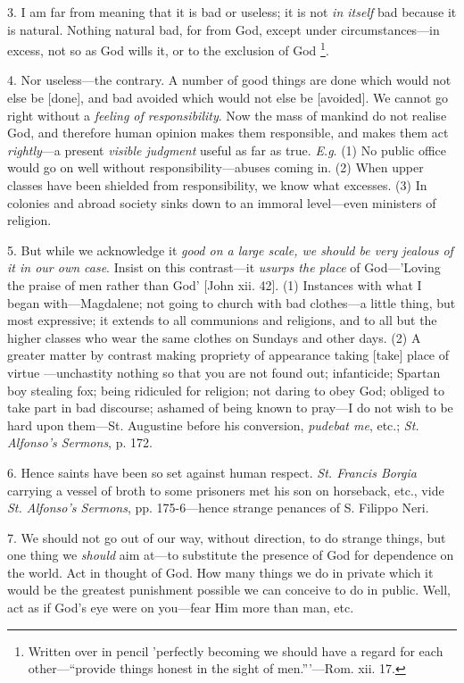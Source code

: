 3. I am far from meaning that it is bad or
useless; it is not \emph{in itself} bad because it is natural. Nothing
natural bad, for from God, except under circumstances—in excess, not
so as God wills it, or to the exclusion of God \footnote{Written over in pencil
'perfectly becoming we should have a regard for each other—``provide
things honest in the sight of men.'''—Rom. xii. 17.}.

4. Nor useless—the contrary. A number of good
things are done which would not else be [done], and bad avoided which
would not else be [avoided]. We cannot go right without a \emph{feeling
of responsibility}. Now the mass of mankind do not realise God, and
therefore human opinion makes them responsible, and makes them act \emph{rightly}—a
present \emph{visible judgment} useful as far as true. \emph{E.g}. (1)
No public office would go on well without responsibility—abuses
coming in. (2) When upper classes have been shielded from
responsibility, we know what excesses. (3) In colonies and abroad
society sinks down to an immoral level—even ministers of religion.

5. But while we acknowledge it \emph{good on a large
scale, we should be very jealous of it in our own case}. Insist on
this contrast—it \emph{usurps the place} of God—'Loving the praise
of men rather than God' [John xii. 42]. (1) Instances with what I
began with—Magdalene; not going to church with bad clothes—a
little thing, but most expressive; it extends to all communions and
religions, and to all but the higher classes who wear the same clothes
on Sundays and other days. (2) A greater matter by contrast making
propriety of appearance taking [take] place of virtue —unchastity
nothing so that you are not found out; infanticide; Spartan boy
stealing fox; being ridiculed for religion; not daring to obey God;
obliged to take part in bad discourse; ashamed of being known to
pray—I do not wish to be hard upon them—St. Augustine before his
conversion, \emph{pudebat me}, etc.; \emph{St. Alfonso's Sermons}, p.
172.

6. Hence saints have been so set against human
respect. \emph{St. Francis Borgia} carrying a vessel of broth to some
prisoners met his son on horseback, etc., vide \emph{St. Alfonso's
Sermons}, pp. 175-6—hence strange penances of S. Filippo Neri.

7. We should not go out of our way, without
direction, to do strange things, but one thing we \emph{should} aim
at—to substitute the presence of God for dependence on the world.
Act in thought of God. How many things we do in private which it would
be the greatest punishment possible we can conceive to do in public.
Well, act as if God's eye were on you—fear Him more than man, etc.

